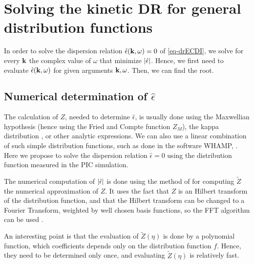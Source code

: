 
\section{Solving the kinetic \acs{DR} for general distribution functions}
  \label{sec-DR-solver}


  In order to solve the dispersion relation $\hat\epsilon({\mathbf k}, \omega) = 0$ of \cref{eq-drECDI}, we solve for every ${\mathbf k}$ the complex value of $\omega$ that minimize $\lvert\hat\epsilon\rvert$.
  Hence, we first need to evaluate $\hat\epsilon({\mathbf k}, \omega)$ for given arguments ${\mathbf k}, \omega$.
  Then, we can find the root.
  

  \subsection{Numerical determination of \texorpdfstring{$\hat\epsilon$}{the plasma dielectric function.}} \label{subsec-numepsilon}
  
  The calculation of $Z$, needed to determine $\hat{\epsilon}$, is usually done using the Maxwellian hypothesis \citep{cavalier2013} (hence using the Fried and Compte function $Z_M$), the kappa distribution \citep{ziebell2017}, or other analytic expressions.
  We can also use a linear combination of such simple distribution functions, such as done in the software WHAMP, \citet{ronnmark1982}.
  Here we propose to solve the dispersion relation $\hat{\epsilon}=0$ using the distribution function measured in the \ac{PIC} simulation.
  
  
  The numerical computation of $\lvert\hat\epsilon\rvert$ is done using the method of \citet{xie2013} for computing $\tilde{Z}$ the numerical approximation of $Z$. 
  It uses the fact that $Z$ is an Hilbert transform of the distribution function, and that the Hilbert transform can be changed to a Fourier Transform, weighted by well chosen basis functions, so the \ac{FFT} algorithm can be used \citep{weideman1995}.
  
  An interesting point is that the evaluation of $\tilde{Z}(\eta)$ is done by a polynomial function, which coefficients depends only on the distribution function $f$. 
  Hence, they need to be determined only once, and evaluating $\tilde{Z}(\eta)$ is relatively fast.
  
